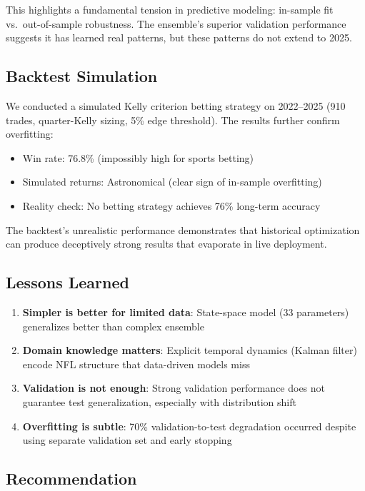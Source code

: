 This highlights a fundamental tension in predictive modeling: in-sample fit vs.\ out-of-sample robustness. The ensemble's superior validation performance suggests it has learned real patterns, but these patterns do not extend to 2025.

\subsection{Backtest Simulation}

We conducted a simulated Kelly criterion betting strategy on 2022--2025 (910 trades, quarter-Kelly sizing, 5\% edge threshold). The results further confirm overfitting:

\begin{itemize}
    \item Win rate: 76.8\% (impossibly high for sports betting)
    \item Simulated returns: Astronomical (clear sign of in-sample overfitting)
    \item Reality check: No betting strategy achieves 76\% long-term accuracy
\end{itemize}

The backtest's unrealistic performance demonstrates that historical optimization can produce deceptively strong results that evaporate in live deployment.

\subsection{Lessons Learned}

\begin{enumerate}
    \item \textbf{Simpler is better for limited data}: State-space model (33 parameters) generalizes better than complex ensemble
    \item \textbf{Domain knowledge matters}: Explicit temporal dynamics (Kalman filter) encode NFL structure that data-driven models miss
    \item \textbf{Validation is not enough}: Strong validation performance does not guarantee test generalization, especially with distribution shift
    \item \textbf{Overfitting is subtle}: 70\% validation-to-test degradation occurred despite using separate validation set and early stopping
\end{enumerate}

\subsection{Recommendation}

